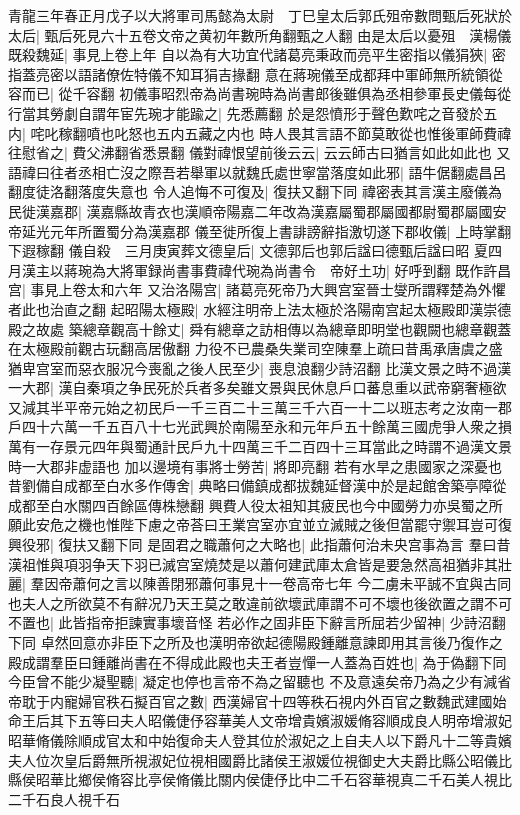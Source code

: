 青龍三年春正月戊子以大將軍司馬懿為太尉　丁巳皇太后郭氏殂帝數問甄后死狀於太后|{
	甄后死見六十五卷文帝之黄初年數所角翻甄之人翻}
由是太后以憂殂　漢楊儀既殺魏延|{
	事見上卷上年}
自以為有大功宜代諸葛亮秉政而亮平生密指以儀狷狹|{
	密指蓋亮密以語諸僚佐特儀不知耳狷吉掾翻}
意在蔣琬儀至成都拜中軍師無所統領從容而已|{
	從千容翻}
初儀事昭烈帝為尚書琬時為尚書郎後雖俱為丞相參軍長史儀每從行當其勞劇自謂年宦先琬才能踰之|{
	先悉薦翻}
於是怨憤形于聲色歎咤之音發於五内|{
	咤叱稼翻噴也叱怒也五内五藏之内也}
時人畏其言語不節莫敢從也惟後軍師費禕往慰省之|{
	費父沸翻省悉景翻}
儀對禕恨望前後云云|{
	云云師古曰猶言如此如此也}
又語禕曰往者丞相亡沒之際吾若舉軍以就魏氏處世寧當落度如此邪|{
	語牛倨翻處昌呂翻度徒洛翻落度失意也}
令人追悔不可復及|{
	復扶又翻下同}
禕密表其言漢主廢儀為民徙漢嘉郡|{
	漢嘉縣故青衣也漢順帝陽嘉二年改為漢嘉屬蜀郡屬國都尉蜀郡屬國安帝延光元年所置蜀分為漢嘉郡}
儀至徙所復上書誹謗辭指激切遂下郡收儀|{
	上時掌翻下遐稼翻}
儀自殺　三月庚寅葬文德皇后|{
	文德郭后也郭后諡曰德甄后諡曰昭}
夏四月漢主以蔣琬為大將軍録尚書事費禕代琬為尚書令　帝好土功|{
	好呼到翻}
既作許昌宫|{
	事見上卷太和六年}
又治洛陽宫|{
	諸葛亮死帝乃大興宫室晉士燮所謂釋楚為外懼者此也治直之翻}
起昭陽太極殿|{
	水經注明帝上法太極於洛陽南宫起太極殿即漢崇德殿之故處}
築總章觀高十餘丈|{
	舜有總章之訪相傳以為總章即明堂也觀闕也總章觀蓋在太極殿前觀古玩翻高居傲翻}
力役不已農桑失業司空陳羣上疏曰昔禹承唐虞之盛猶卑宫室而惡衣服况今喪亂之後人民至少|{
	喪息浪翻少詩沼翻}
比漢文景之時不過漢一大郡|{
	漢自秦項之争民死於兵者多矣雖文景與民休息戶口蕃息重以武帝窮奢極欲又減其半平帝元始之初民戶一千三百二十三萬三千六百一十二以班志考之汝南一郡戶四十六萬一千五百八十七光武興於南陽至永和元年戶五十餘萬三國虎爭人衆之損萬有一存景元四年與蜀通計民戶九十四萬三千二百四十三耳當此之時謂不過漢文景時一大郡非虚語也}
加以邊境有事將士勞苦|{
	將即亮翻}
若有水旱之患國家之深憂也昔劉備自成都至白水多作傳舍|{
	典略曰備鎮成都拔魏延督漢中於是起館舍築亭障從成都至白水關四百餘區傳株戀翻}
興費人役太祖知其疲民也今中國勞力亦吳蜀之所願此安危之機也惟陛下慮之帝荅曰王業宫室亦宜並立滅賊之後但當罷守禦耳豈可復興役邪|{
	復扶又翻下同}
是固君之職蕭何之大略也|{
	此指蕭何治未央宫事為言}
羣曰昔漢祖惟與項羽争天下羽已滅宫室燒焚是以蕭何建武庫太倉皆是要急然高祖猶非其壯麗|{
	羣因帝蕭何之言以陳善閉邪蕭何事見十一卷高帝七年}
今二虜未平誠不宜與古同也夫人之所欲莫不有辭况乃天王莫之敢違前欲壞武庫謂不可不壞也後欲置之謂不可不置也|{
	此皆指帝拒諫實事壞音怪}
若必作之固非臣下辭言所屈若少留神|{
	少詩沼翻下同}
卓然回意亦非臣下之所及也漢明帝欲起德陽殿鍾離意諫即用其言後乃復作之殿成謂羣臣曰鍾離尚書在不得成此殿也夫王者豈憚一人蓋為百姓也|{
	為于偽翻下同}
今臣曾不能少凝聖聽|{
	凝定也停也言帝不為之留聽也}
不及意遠矣帝乃為之少有減省帝耽于内寵婦官秩石擬百官之數|{
	西漢婦官十四等秩石視内外百官之數魏武建國始命王后其下五等曰夫人昭儀倢伃容華美人文帝增貴嬪淑媛脩容順成良人明帝增淑妃昭華脩儀除順成官太和中始復命夫人登其位於淑妃之上自夫人以下爵凡十二等貴嬪夫人位次皇后爵無所視淑妃位視相國爵比諸侯王淑媛位視御史大夫爵比縣公昭儀比縣侯昭華比鄉侯脩容比亭侯脩儀比關内侯倢伃比中二千石容華視真二千石美人視比二千石良人視千石}
